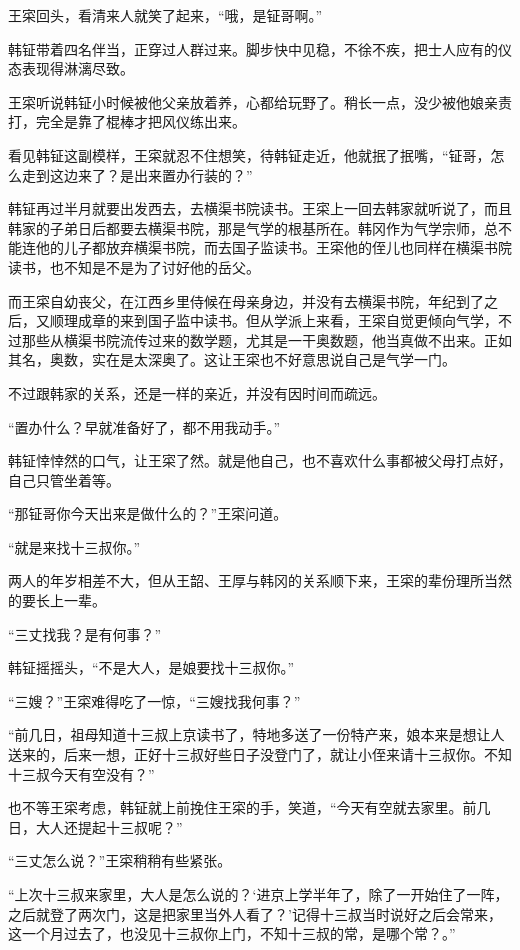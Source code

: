 王寀回头，看清来人就笑了起来，“哦，是钲哥啊。”

韩钲带着四名伴当，正穿过人群过来。脚步快中见稳，不徐不疾，把士人应有的仪态表现得淋漓尽致。

王寀听说韩钲小时候被他父亲放着养，心都给玩野了。稍长一点，没少被他娘亲责打，完全是靠了棍棒才把风仪练出来。

看见韩钲这副模样，王寀就忍不住想笑，待韩钲走近，他就抿了抿嘴，“钲哥，怎么走到这边来了？是出来置办行装的？”

韩钲再过半月就要出发西去，去横渠书院读书。王寀上一回去韩家就听说了，而且韩家的子弟日后都要去横渠书院，那是气学的根基所在。韩冈作为气学宗师，总不能连他的儿子都放弃横渠书院，而去国子监读书。王寀他的侄儿也同样在横渠书院读书，也不知是不是为了讨好他的岳父。

而王寀自幼丧父，在江西乡里侍候在母亲身边，并没有去横渠书院，年纪到了之后，又顺理成章的来到国子监中读书。但从学派上来看，王寀自觉更倾向气学，不过那些从横渠书院流传过来的数学题，尤其是一干奥数题，他当真做不出来。正如其名，奥数，实在是太深奥了。这让王寀也不好意思说自己是气学一门。

不过跟韩家的关系，还是一样的亲近，并没有因时间而疏远。

“置办什么？早就准备好了，都不用我动手。”

韩钲悻悻然的口气，让王寀了然。就是他自己，也不喜欢什么事都被父母打点好，自己只管坐着等。

“那钲哥你今天出来是做什么的？”王寀问道。

“就是来找十三叔你。”

两人的年岁相差不大，但从王韶、王厚与韩冈的关系顺下来，王寀的辈份理所当然的要长上一辈。

“三丈找我？是有何事？”

韩钲摇摇头，“不是大人，是娘要找十三叔你。”

“三嫂？”王寀难得吃了一惊，“三嫂找我何事？”

“前几日，祖母知道十三叔上京读书了，特地多送了一份特产来，娘本来是想让人送来的，后来一想，正好十三叔好些日子没登门了，就让小侄来请十三叔你。不知十三叔今天有空没有？”

也不等王寀考虑，韩钲就上前挽住王寀的手，笑道，“今天有空就去家里。前几日，大人还提起十三叔呢？”

“三丈怎么说？”王寀稍稍有些紧张。

“上次十三叔来家里，大人是怎么说的？‘进京上学半年了，除了一开始住了一阵，之后就登了两次门，这是把家里当外人看了？’记得十三叔当时说好之后会常来，这一个月过去了，也没见十三叔你上门，不知十三叔的常，是哪个常？。”

